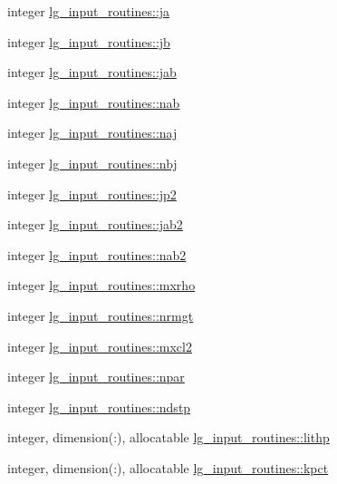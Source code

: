 \begin{DoxyCompactItemize}
\item 
integer \hyperlink{namespacelg__input__routines_aee9292c01f55d537f7cafc9a3e5201bf}{lg\+\_\+input\+\_\+routines\+::ja}
\item 
integer \hyperlink{namespacelg__input__routines_a3d09f96b92b5909671209cf341d8939f}{lg\+\_\+input\+\_\+routines\+::jb}
\item 
integer \hyperlink{namespacelg__input__routines_a2b02a6181257c199eba71b3c92fb5be9}{lg\+\_\+input\+\_\+routines\+::jab}
\item 
integer \hyperlink{namespacelg__input__routines_ad8cb720dd00a45f91821df0e50967fc4}{lg\+\_\+input\+\_\+routines\+::nab}
\item 
integer \hyperlink{namespacelg__input__routines_a6a4d2fe97ff751ec658cd7c4c32c8dd8}{lg\+\_\+input\+\_\+routines\+::naj}
\item 
integer \hyperlink{namespacelg__input__routines_a422223cb66d2146d9c188127e4a028e2}{lg\+\_\+input\+\_\+routines\+::nbj}
\item 
integer \hyperlink{namespacelg__input__routines_aeeb364d56f6ccfca2d83c6f2f2116115}{lg\+\_\+input\+\_\+routines\+::jp2}
\item 
integer \hyperlink{namespacelg__input__routines_aa8dab0fb04a941c104a2358b9964b3cb}{lg\+\_\+input\+\_\+routines\+::jab2}
\item 
integer \hyperlink{namespacelg__input__routines_a8c395208e3c4b867a9efb124950523a2}{lg\+\_\+input\+\_\+routines\+::nab2}
\item 
integer \hyperlink{namespacelg__input__routines_a32d71e3a5fd9797e3422ec85a3ba569b}{lg\+\_\+input\+\_\+routines\+::mxrho}
\item 
integer \hyperlink{namespacelg__input__routines_af065b07a125b49a6638714fca2349dab}{lg\+\_\+input\+\_\+routines\+::nrmgt}
\item 
integer \hyperlink{namespacelg__input__routines_a2a758312b4913fc8c9b224c38fe7e237}{lg\+\_\+input\+\_\+routines\+::mxcl2}
\item 
integer \hyperlink{namespacelg__input__routines_a541838bde966c293ecaa09ac831cdb04}{lg\+\_\+input\+\_\+routines\+::npar}
\item 
integer \hyperlink{namespacelg__input__routines_a22a8c2d22e2d56ee4bc62e61d835e08e}{lg\+\_\+input\+\_\+routines\+::ndstp}
\item 
integer, dimension(\+:), allocatable \hyperlink{namespacelg__input__routines_aedb9ca6e70c3410a22b403679af5fc20}{lg\+\_\+input\+\_\+routines\+::lithp}
\item 
integer, dimension(\+:), allocatable \hyperlink{namespacelg__input__routines_aea4fa508483e9e73a626c0e62232d1f4}{lg\+\_\+input\+\_\+routines\+::kpct}

\end{DoxyCompactItemize}
